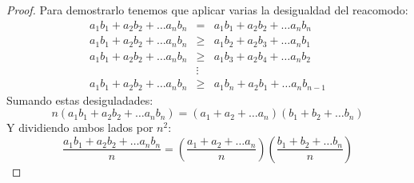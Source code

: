 \documentclass[11pt]{scrartcl}
\begin{document}
\begin{proof}
Para demostrarlo tenemos que aplicar varias la desigualdad del reacomodo: 
\begin{eqnarray*}
    a_1b_1 + a_2b_2 + \dots a_nb_n &=& a_1b_1 + a_2b_2 + \dots a_nb_n \\
    a_1b_1 + a_2b_2 + \dots a_nb_n &\geq& a_1b_2 + a_2b_3 + \dots a_nb_1 \\
    a_1b_1 + a_2b_2 + \dots a_nb_n &\geq& a_1b_3 + a_2b_4 + \dots a_nb_2 \\
    &\vdots& \\
    a_1b_1 + a_2b_2 + \dots a_nb_n &\geq& a_1b_n + a_2b_1 + \dots a_nb_{n-1}
\end{eqnarray*}
Sumando estas desiguladades:
\begin{equation*}
    n\left(a_1b_1 + a_2b_2 + \dots a_nb_n\right) = \left(a_1 + a_2 + \dots a_n\right)\left(b_1 + b_2 + \dots b_n\right)
\end{equation*}
Y dividiendo ambos lados por $n^2$:
\begin{equation*}
    \frac{a_1b_1 + a_2b_2 + \dots a_nb_n}{n} = \left(\frac{a_1 + a_2 + \dots a_n}{n}\right)\left(\frac{b_1 + b_2 + \dots b_n}{n}\right)
\end{equation*}
\end{proof}
\end{document}
